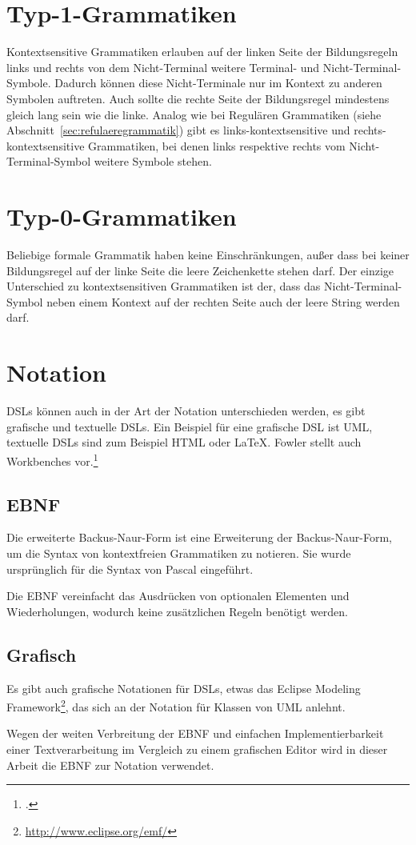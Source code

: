 \documentclass[../InterneDSLs.tex]{subfiles}
\begin{document}
\section{Typ-1-Grammatiken}\label{sec:kontextsensitivegrammatik}
Kontextsensitive Grammatiken erlauben auf der linken Seite der Bildungsregeln links und rechts von dem Nicht-Terminal weitere Terminal- und Nicht-Terminal-Symbole. Dadurch können diese Nicht-Terminale nur im Kontext zu anderen Symbolen auftreten. Auch sollte die rechte Seite der Bildungsregel mindestens gleich lang sein wie die linke. Analog wie bei Regulären Grammatiken (siehe Abschnitt~\ref{sec:refulaeregrammatik}) gibt es links-kontextsensitive und rechts-kontextsensitive Grammatiken, bei denen links respektive rechts vom Nicht-Terminal-Symbol weitere Symbole stehen.

\section{Typ-0-Grammatiken}\label{sec:beliebigegrammatik}
Beliebige formale Grammatik haben keine Einschränkungen, außer dass bei keiner Bildungsregel auf der linke Seite die leere Zeichenkette stehen darf. Der einzige Unterschied zu kontextsensitiven Grammatiken ist der, dass das Nicht-Terminal-Symbol neben einem Kontext auf der rechten Seite auch der leere String werden darf.


\section{Notation}
DSLs können auch in der Art der Notation unterschieden werden, es gibt grafische und textuelle DSLs. Ein Beispiel für eine grafische DSL ist UML, textuelle DSLs sind zum Beispiel HTML oder LaTeX. Fowler stellt auch Workbenches vor.\footcite[][S. 22ff]{Fowler.2010}

\subsection{EBNF}
Die erweiterte Backus-Naur-Form ist eine Erweiterung der Backus-Naur-Form, um die Syntax von kontextfreien Grammatiken zu notieren. Sie wurde ursprünglich für die Syntax von Pascal eingeführt.

Die EBNF vereinfacht das Ausdrücken von optionalen Elementen und Wiederholungen, wodurch keine zusätzlichen Regeln benötigt werden.

\subsection{Grafisch}
Es gibt auch grafische Notationen für DSLs, etwas das Eclipse Modeling Framework\footnote{\url{http://www.eclipse.org/emf/}}, das sich an der Notation für Klassen von UML anlehnt.

Wegen der weiten Verbreitung der EBNF und einfachen Implementierbarkeit einer Textverarbeitung im Vergleich zu einem grafischen Editor wird in dieser Arbeit die EBNF zur Notation verwendet.
\end{document}

